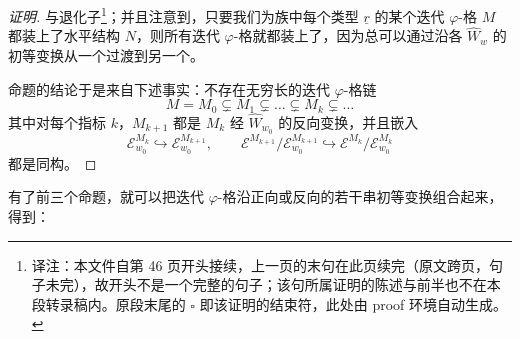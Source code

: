 
\begin{proof}[证明]
与退化子\footnote{译注：本文件自第 46 页开头接续，上一页的末句在此页续完（原文跨页，句子未完），故开头不是一个完整的句子；该句所属证明的陈述与前半也不在本段转录稿内。原段末尾的 $\square$ 即该证明的结束符，此处由 proof 环境自动生成。}；并且注意到，只要我们为族中每个类型 $\underline{r}$ 的某个迭代 $\varphi$-格 $M$ 都装上了水平结构 $N$，则所有迭代 $\varphi$-格就都装上了，因为总可以通过沿各 $\widehat{W}_w$ 的初等变换从一个过渡到另一个。

命题的结论于是来自下述事实：不存在无穷长的迭代 $\varphi$-格链
\[
M = M_0 \subsetneq M_1 \subsetneq \dots \subsetneq M_k \subsetneq \dots
\]
其中对每个指标 $k$，$M_{k+1}$ 都是 $M_k$ 经 $\widehat{W}_{w_0}$ 的反向变换，并且嵌入
\[
\mathcal{E}^{M_k}_{w_0} \hookrightarrow \mathcal{E}^{M_{k+1}}_{w_0}, \qquad
\mathcal{E}^{M_{k+1}}/\mathcal{E}^{M_{k+1}}_{w_0} \hookrightarrow \mathcal{E}^{M_k}/\mathcal{E}^{M_k}_{w_0}
\]
都是同构。
\end{proof}

有了前三个命题，就可以把迭代 $\varphi$-格沿正向或反向的若干串初等变换组合起来，得到：

